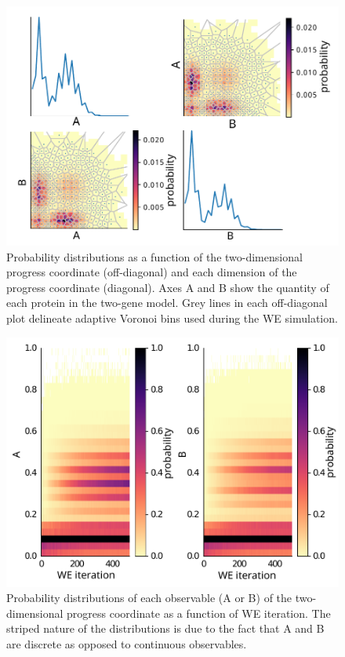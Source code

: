 \begin{figure}[t]
\centering
\includegraphics[width=\columnwidth]{figures/Figure14_ProbDist.pdf}
\caption{Probability distributions as a function of the two-dimensional progress coordinate (off-diagonal) and each dimension of the progress coordinate (diagonal).
Axes A and B show the quantity of each protein in the two-gene model.
Grey lines in each off-diagonal plot delineate adaptive Voronoi bins used during the WE simulation.}
\label{fig:bngl-bins-proteins}
\end{figure}

\begin{figure}[t]
\centering
\includegraphics[width=\columnwidth]{figures/Figure15_ProbDist2.pdf}
\caption{Probability distributions of each observable (A or B) of the two-dimensional progress coordinate as a function of WE iteration. 
The striped nature of the distributions is due to the fact that A and B are discrete as opposed to continuous observables.}
\label{fig:bngl-iterations}
\end{figure}

